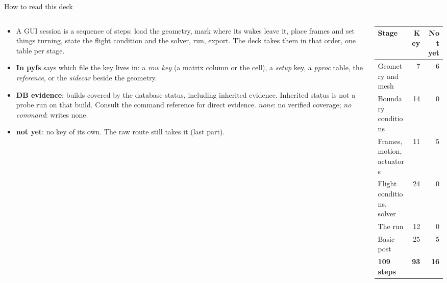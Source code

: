 %

\begin{frame}{How to read this deck}
\begin{columns}[T]
\begin{column}{0.56\textwidth}
\begin{itemize}\footnotesize
  \item A GUI session is a sequence of steps: load the geometry, mark where its
        wakes leave it, place frames and set things turning, state the flight
        condition and the solver, run, export. The deck takes them in that
        order, one table per stage.
  \item \textbf{In pyfs} says which file the key lives in: a \emph{row key}
        (a matrix column or the  cell), a
        \emph{setup} key, a \emph{pproc} table, the \emph{reference}, or the
        \emph{sidecar}  beside the geometry.
  \item \textbf{DB evidence}: builds covered by the database status,
        including inherited evidence. Inherited status is not a probe run
        on that build. Consult the command reference for direct evidence.
        \emph{none}: no verified coverage; \emph{no command}: writes none.
  \item \textbf{not yet}: no key of its own. The raw route still takes it
        (last part).
\end{itemize}
\end{column}
\begin{column}{0.40\textwidth}
{\ftstablesize\setlength{\tabcolsep}{4pt}
\begin{tabular}{@{}lrr@{}}
\toprule
\textbf{Stage} & \textbf{Key} & \textbf{Not yet} \\
\midrule
Geometry and mesh & 7 & 6 \\
Boundary conditions & 14 & 0 \\
Frames, motion, actuators & 11 & 5 \\
Flight conditions, solver & 24 & 0 \\
The run & 12 & 0 \\
Basic post & 25 & 5 \\
\midrule
\textbf{109 steps} & \textbf{93} & \textbf{16} \\
\bottomrule
\end{tabular}}
\end{column}
\end{columns}
\end{frame}
